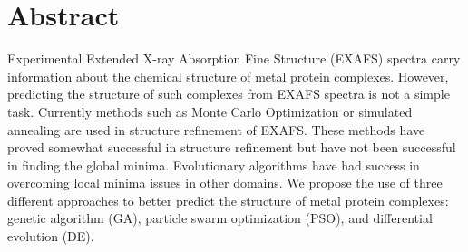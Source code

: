 \thispagestyle{empty}
\section*{Abstract}
\begin{doublespace}
Experimental Extended X-ray Absorption Fine Structure (EXAFS) spectra carry information about the chemical structure of metal protein complexes. However, predicting the structure of such complexes from EXAFS spectra is not a simple task. Currently methods such as Monte Carlo Optimization or simulated annealing are used in structure refinement of EXAFS. These methods have proved somewhat successful in structure refinement but have not been successful in finding the global minima. Evolutionary algorithms have had success in overcoming local minima issues in other domains. We propose the use of three different approaches to better predict the structure of metal protein complexes: genetic algorithm (GA), particle swarm optimization (PSO), and differential evolution (DE).
\end{doublespace}   

